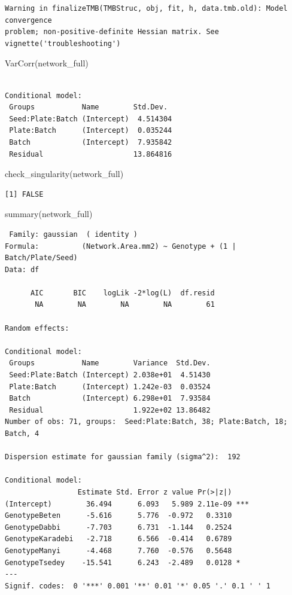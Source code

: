 \documentclass[
  letterpaper,
  DIV=11,
  numbers=noendperiod]{scrartcl}
\newenvironment{Shaded}{\begin{snugshade}}{\end{snugshade}}
\newcommand{\FunctionTok}[1]{\textcolor[rgb]{0.28,0.35,0.67}{#1}}
\newcommand{\NormalTok}[1]{\textcolor[rgb]{0.00,0.23,0.31}{#1}}
\begin{document}
\begin{verbatim}
Warning in finalizeTMB(TMBStruc, obj, fit, h, data.tmb.old): Model convergence
problem; non-positive-definite Hessian matrix. See vignette('troubleshooting')
\end{verbatim}

\begin{Shaded}
\begin{Highlighting}[]
\FunctionTok{VarCorr}\NormalTok{(network\_full)}
\end{Highlighting}
\end{Shaded}

\begin{verbatim}

Conditional model:
 Groups           Name        Std.Dev. 
 Seed:Plate:Batch (Intercept)  4.514304
 Plate:Batch      (Intercept)  0.035244
 Batch            (Intercept)  7.935842
 Residual                     13.864816
\end{verbatim}

\begin{Shaded}
\begin{Highlighting}[]
\FunctionTok{check\_singularity}\NormalTok{(network\_full)}
\end{Highlighting}
\end{Shaded}

\begin{verbatim}
[1] FALSE
\end{verbatim}

\begin{Shaded}
\begin{Highlighting}[]
\FunctionTok{summary}\NormalTok{(network\_full)}
\end{Highlighting}
\end{Shaded}

\begin{verbatim}
 Family: gaussian  ( identity )
Formula:          (Network.Area.mm2) ~ Genotype + (1 | Batch/Plate/Seed)
Data: df

      AIC       BIC    logLik -2*log(L)  df.resid 
       NA        NA        NA        NA        61 

Random effects:

Conditional model:
 Groups           Name        Variance  Std.Dev.
 Seed:Plate:Batch (Intercept) 2.038e+01  4.51430
 Plate:Batch      (Intercept) 1.242e-03  0.03524
 Batch            (Intercept) 6.298e+01  7.93584
 Residual                     1.922e+02 13.86482
Number of obs: 71, groups:  Seed:Plate:Batch, 38; Plate:Batch, 18; Batch, 4

Dispersion estimate for gaussian family (sigma^2):  192 

Conditional model:
                 Estimate Std. Error z value Pr(>|z|)    
(Intercept)        36.494      6.093   5.989 2.11e-09 ***
GenotypeBeten      -5.616      5.776  -0.972   0.3310    
GenotypeDabbi      -7.703      6.731  -1.144   0.2524    
GenotypeKaradebi   -2.718      6.566  -0.414   0.6789    
GenotypeManyi      -4.468      7.760  -0.576   0.5648    
GenotypeTsedey    -15.541      6.243  -2.489   0.0128 *  
---
Signif. codes:  0 '***' 0.001 '**' 0.01 '*' 0.05 '.' 0.1 ' ' 1
\end{verbatim}
\end{document}
